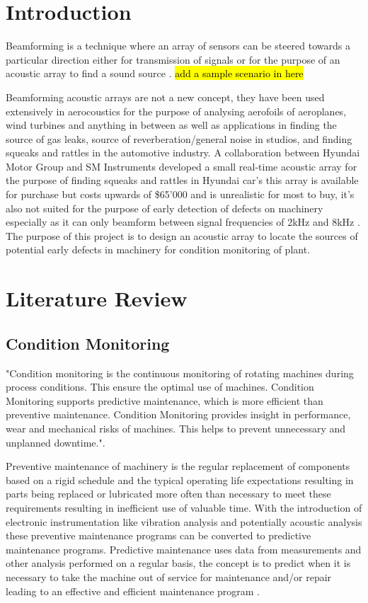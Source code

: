 \documentclass{UoNMCHA}
\numberwithin{equation}{section}
\begin{document}
\section{Introduction} \label{sec:Introduction}
    
    Beamforming is a technique where an array of sensors can be steered towards a particular direction either for transmission of signals or for the purpose of an acoustic array to find a sound source \citep{Sha18}. \hl{ add a sample scenario in here}
    
    Beamforming acoustic arrays are not a new concept, they have been used extensively in aerocoustics for the purpose of analysing aerofoils of aeroplanes, wind turbines and anything in between as well as applications in finding the source of gas leaks, source of reverberation/general noise in studios, and finding squeaks and rattles in the automotive industry. A collaboration between Hyundai Motor Group and SM Instruments developed a small real-time acoustic array for the purpose of finding squeaks and rattles in Hyundai car's this array is available for purchase but costs upwards of \$65'000 and is unrealistic for most to buy, it's also not suited for the purpose of early detection of defects on machinery especially as it can only beamform between signal frequencies of 2kHz and 8kHz \citep{Smi}. The purpose of this project is to design an acoustic array to locate the sources of potential early defects in machinery for condition monitoring of plant.
    
\newpage
\section{Literature Review} \label{sec:Literature Review}
\subsection{Condition Monitoring} \label{sec:Condition Monitoring}
    "Condition monitoring is the continuous monitoring of rotating machines during process conditions. This ensure the optimal use of machines. Condition Monitoring supports predictive maintenance, which is more efficient than preventive maintenance. Condition Monitoring provides insight in performance, wear and mechanical risks of machines. This helps to prevent unnecessary and unplanned downtime."\citep{Ist}.
    
    Preventive maintenance of machinery is the regular replacement of components based on a rigid schedule and the typical operating life expectations resulting in parts being replaced or lubricated more often than necessary to meet these requirements resulting in inefficient use of valuable time. With the introduction of electronic instrumentation like vibration analysis and potentially acoustic analysis these preventive maintenance programs can be converted to predictive maintenance programs. Predictive maintenance uses data from measurements and other analysis performed on a regular basis, the concept is to predict when it is necessary to take the machine out of service for maintenance and/or repair leading to an effective and efficient maintenance program \citep{Laws87}.
    
\end{document}
